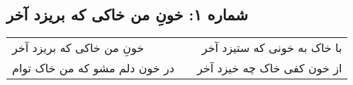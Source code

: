 \begin{center}
\section*{شماره ۱: خونِ من خاکی که بریزد آخر}
\label{sec:001}
\begin{longtable}{l p{0.5cm} r}
خونِ من خاکی که بریزد آخر
&&
با خاک به خونی که ستیزد آخر
\\
در خون دلم مشو که من خاک توام
&&
از خون کفی خاک چه خیزد آخر
\\
\end{longtable}
\end{center}
